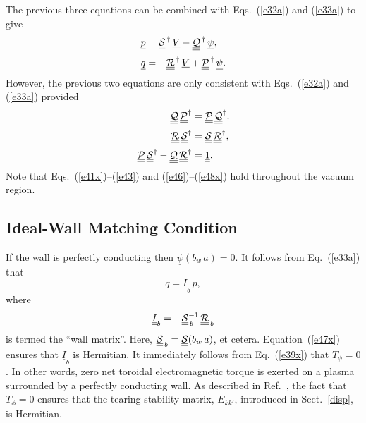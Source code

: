 \documentclass[12pt,prb,aps]{revtex4-1}
\begin{document}
The previous three equations can be combined with Eqs.~(\ref{e32a}) and (\ref{e33a}) to give 
\begin{align}
\underline{p} &= \underline{\underline{\cal S}}^{\,\dag} \,\underline{V} - \underline{\underline{\cal Q}}^{\,\dag}\,\underline{\psi},\\[0.5ex]
\underline{q} &= -\underline{\underline{\cal R}}^{\,\dag} \,\underline{V} + \underline{\underline{\cal P}}^{\,\dag}\,\underline{\psi}.
\end{align}
However, the previous two equations are only consistent with Eqs.~(\ref{e32a}) and (\ref{e33a}) provided 
\begin{align}\label{e46}
\underline{\underline{\cal Q}}\,\underline{\underline{\cal P}}^\dag&= \underline{\underline{\cal P}}\,\underline{\underline{\cal Q}}^\dag,\\[0.5ex]
\underline{\underline{\cal R}}\,\underline{\underline{\cal S}}^\dag&= \underline{\underline{\cal S}}\,\underline{\underline{\cal R}}^\dag,\label{e47x}\\[0.5ex]
\underline{\underline{\cal P}}\,\underline{\underline{\cal S}}^{\dag}- \underline{\underline{\cal Q}}\,\underline{\underline{\cal R}}^{\dag}&=\underline{\underline{1}}.\label{e48x}
\end{align}
Note that Eqs.~(\ref{e41x})--(\ref{e43}) and (\ref{e46})--(\ref{e48x}) hold throughout the vacuum region. 

\subsection{Ideal-Wall Matching Condition}
If the wall is perfectly conducting then  $\underline{\psi}(b_w\,a)=0$. 
It follows from Eq.~(\ref{e33a}) that
\begin{equation}
\underline{q} = \underline{\underline{I}}_b\,\underline{p},
\end{equation}
where
\begin{equation}
 \underline{\underline{I}}_b=- \underline{\underline{\cal S}}_{\,b}^{-1}\,\underline{\underline{\cal R}}_{\,b}
 \end{equation}
 is termed the ``wall matrix''.
 Here, $\underline{\underline{\cal S}}_{\,b}= \underline{\underline{\cal S}}(b_w\,a)$, et cetera. Equation~(\ref{e47x}) ensures that $ \underline{\underline{I}}_b$
 is Hermitian. It immediately follows from Eq.~(\ref{e39x}) that $T_\phi=0$. In other words, zero net toroidal electromagnetic torque is exerted on a plasma
 surrounded by a perfectly conducting wall. As described in Ref.~, the fact that $T_\phi=0$ ensures that the tearing stability matrix, $E_{kk'}$, introduced in
 Sect.~\ref{disp}, is Hermitian. 
\end{document}
